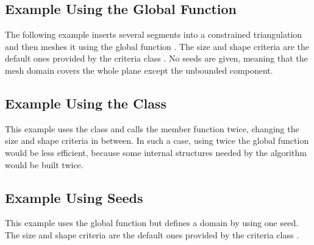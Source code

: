 \subsection{Example Using the Global Function}

The following example inserts several segments into a constrained
triangulation and then meshes it using the global function
. The size and shape criteria are the default ones
provided by the criteria class . No seeds are
given, meaning that the mesh domain covers the whole plane except the
unbounded component.


\subsection{Example Using the Class \protect{}}

This example uses the class  and calls
  the  member function twice, changing the size and
  shape criteria in between. In such a case, using twice the global
  function  would be less efficient,
  because some internal structures needed by the algorithm would be
  built twice.


\subsection{Example Using Seeds}

This example uses the global function  but
defines a domain by using one seed. The size and shape criteria are the
default ones provided by the criteria class .


